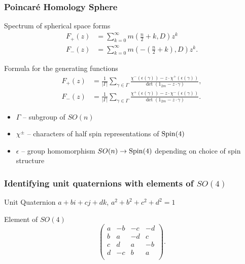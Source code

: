 \documentclass{beamer}
\def\Spin{{\rm Spin}}
\begin{document}
\begin{frame}
	\frametitle{Poincar\'e Homology Sphere}
	\begin{block}{Spectrum of spherical space forms}
	\begin{align*}
F_+(z) & = \sum_{k=0}^{\infty} m (\frac{n}{2}+k,D)z^k  \\
F_-(z) &= \sum_{k=0}^{\infty} m (-(\frac{n}{2}+k),D)z^k .
\end{align*}
	\end{block}
\end{frame}

\begin{frame}
	\begin{block}{Formula for the generating functions}
		\begin{align*}
F_+ (z) &= \frac{1}{| \Gamma |} \sum_{\gamma \in \Gamma}  \frac{\chi^-(\epsilon(\gamma)) - z \cdot \chi^+ (\epsilon(\gamma))}{\det(1_{2m} - z \cdot \gamma)}, \\ \label{Spmultgen2}
F_-(z) &= \frac{1}{| \Gamma |} \sum_{\gamma \in \Gamma} \frac{\chi^+(\epsilon(\gamma)) - z \cdot \chi^- (\epsilon(\gamma))}{\det(1_{2m} - z \cdot \gamma)}.
		\end{align*}
	\end{block}
	
	\begin{block}{}
	\begin{itemize}
		\item $\Gamma$ -- subgroup of $SO(n)$
		\item $\chi^{\pm}$ -- characters of half spin representations of $\Spin(4)$
		\item $\epsilon$ -- group homomorphism $SO(n) \rightarrow \Spin(4)$ depending on choice of spin structure
	\end{itemize}
	\end{block}
\end{frame}

\begin{frame}
	\frametitle{Identifying unit quaternions with elements of  $SO(4)$}
	\begin{block}{Unit Quaternion}
	$a + bi + cj + dk$, $a^2 + b^2 + c^2 + d^2 = 1$
	\end{block}
	\begin{block}{Element of $SO(4)$}
	\[
\left(
\begin{array}{cccc}
a & -b & -c & -d \\
b & a & -d & c \\
c & d & a & -b \\
d & -c & b & a \\
\end{array}
\right).
\]
	\end{block}
\end{frame}
\end{document}
